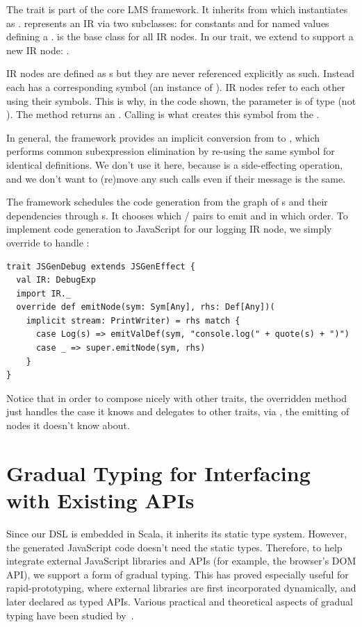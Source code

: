 \documentclass[runningheads,a4paper]{llncs}
\begin{document}
The  trait is part of the core LMS framework. It
inherits from  which instantiates  as
.  represents an IR via two subclasses:
 for constants and  for named values defining a
.  is the base class for all IR nodes. In our
 trait, we extend  to support a new IR node:
.

IR nodes are defined as s but they are never referenced
explicitly as such. Instead each  has a corresponding symbol
(an instance of ). IR nodes refer to each other using their
symbols. This is why, in the code shown, the  parameter is
of type  (not ). The method  
returns an . Calling  is what creates
this symbol from the .

In general, the framework provides an implicit conversion from
 to , which performs common subexpression
elimination by re-using the same symbol for identical definitions. We
don't use it here, because  is a side-effecting operation,
and we don't want to (re)move any such calls even if their message
is the same.

The framework schedules the code generation from the graph of
s and their dependencies through s. It chooses
which / pairs to emit and in which order. To
implement code generation to JavaScript for our logging IR node, we
simply override  to handle :
\begin{lstlisting}
trait JSGenDebug extends JSGenEffect {
  val IR: DebugExp
  import IR._
  override def emitNode(sym: Sym[Any], rhs: Def[Any])(
    implicit stream: PrintWriter) = rhs match {
      case Log(s) => emitValDef(sym, "console.log(" + quote(s) + ")")
      case _ => super.emitNode(sym, rhs)
    }
}
\end{lstlisting}
Notice that in order to compose nicely with other traits, the
overridden method just handles the case it knows and delegates to
other traits, via , the emitting of nodes it doesn't know
about.


\section{Gradual Typing for Interfacing with Existing APIs}\label{sec:typing}
Since our DSL is embedded in Scala, it inherits its static type
system. However, the generated JavaScript code doesn't need the static
types. Therefore, to help integrate external JavaScript libraries and
APIs (for example, the browser's DOM API), we support a form of
gradual typing. This has proved especially useful for
rapid-prototyping, where external libraries are first incorporated
dynamically, and later declared as typed APIs. Various practical and
theoretical aspects of gradual typing have been studied
by~\cite{wadler-blame,blame-for-all,abadi91,siek06,siek07}.
\end{document}
